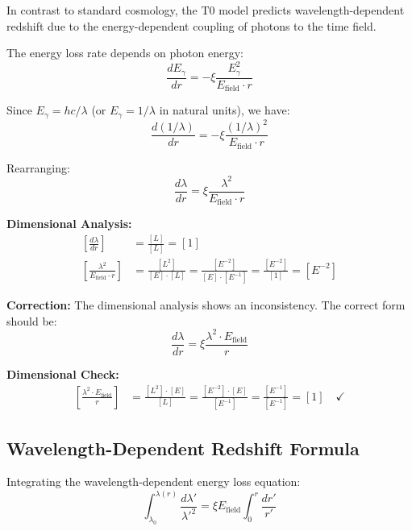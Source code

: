 \documentclass[12pt,a4paper]{report}
\begin{document}
	In contrast to standard cosmology, the T0 model predicts wavelength-dependent redshift due to the energy-dependent coupling of photons to the time field.
	
	The energy loss rate depends on photon energy:
	\begin{equation}
		\frac{dE_\gamma}{dr} = -\xi \frac{E_\gamma^2}{E_{\text{field}} \cdot r}
	\end{equation}
	
	Since $E_\gamma = hc/\lambda$ (or $E_\gamma = 1/\lambda$ in natural units), we have:
	\begin{equation}
		\frac{d(1/\lambda)}{dr} = -\xi \frac{(1/\lambda)^2}{E_{\text{field}} \cdot r}
	\end{equation}
	
	Rearranging:
	\begin{equation}
		\frac{d\lambda}{dr} = \xi \frac{\lambda^2}{E_{\text{field}} \cdot r}
	\end{equation}
	
	\textbf{Dimensional Analysis:}
	\begin{align}
		\left[\frac{d\lambda}{dr}\right] &= \frac{[L]}{[L]} = [1] \\
		\left[\frac{\lambda^2}{E_{\text{field}} \cdot r}\right] &= \frac{[L^2]}{[E] \cdot [L]} = \frac{[E^{-2}]}{[E] \cdot [E^{-1}]} = \frac{[E^{-2}]}{[1]} = [E^{-2}]
	\end{align}
	
	\textbf{Correction:} The dimensional analysis shows an inconsistency. The correct form should be:
	\begin{equation}
		\frac{d\lambda}{dr} = \xi \frac{\lambda^2 \cdot E_{\text{field}}}{r}
	\end{equation}
	
	\textbf{Dimensional Check:}
	\begin{align}
		\left[\frac{\lambda^2 \cdot E_{\text{field}}}{r}\right] &= \frac{[L^2] \cdot [E]}{[L]} = \frac{[E^{-2}] \cdot [E]}{[E^{-1}]} = \frac{[E^{-1}]}{[E^{-1}]} = [1] \quad \checkmark
	\end{align}
	
	\subsection{Wavelength-Dependent Redshift Formula}
\label{subsec:wavelength_dependent_redshift_formula}

Integrating the wavelength-dependent energy loss equation:
\begin{equation}
	\int_{\lambda_0}^{\lambda(r)} \frac{d\lambda'}{\lambda'^2} = \xi E_{\text{field}} \int_0^r \frac{dr'}{r'}
\end{equation}
\end{document}
